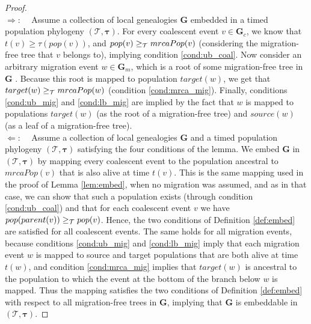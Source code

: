 \documentclass[11pt]{article}
\newcommand{\vect}[1]{\boldsymbol{\mathbf{#1}}}
\newcommand{\Tr}{\mathcal{T}}
\newcommand{\G}{\vect{G}}
\newcommand{\1}{\mathbbm{1}}
\newcommand{\Gc}{\G_c}
\newcommand{\Gm}{\G_m}
\newcommand{\taus}{\vect\tau}
\begin{document}
\begin{proof}
~\\
 $\Rightarrow$:~~ Assume a collection of local genealogies $\G$ embedded in a timed population phylogeny $(\Tr,\taus)$. For every coalescent event $v\in\Gc$, we know that
 $t(v)\geq \tau(pop(v))$, and $pop(v)\anc mrcaPop(v)$ (considering the migration-free tree that $v$ belongs to), implying condition \ref{cond:ub_coal}.
 Now consider an arbitrary migration event $w\in\Gm$, which is a root of some migration-free tree in $\G$ . Because this root is mapped to population $target(w)$, we get that
 $target(w)\anc  mrcaPop(w)$ (condition \ref{cond:mrca_mig}).
 Finally, conditions \ref{cond:ub_mig} and \ref{cond:lb_mig} are implied by the fact that $w$ is mapped to populations $target(w)$ (as the root of a migration-free tree) and
 $source(w)$ (as a leaf of a migration-free tree).\\
 $\Leftarrow$:~~ Assume a collection of local genealogies $\G$ and a timed population phylogeny $(\Tr,\taus)$ satisfying the four conditions of the lemma.
 We embed $\G$ in $(\Tr,\taus)$ by mapping every coalescent event to the population ancestral to $mrcaPop(v)$ that is also alive at time $t(v)$.
 This is the same mapping used in the proof of Lemma \ref{lem:embed}, when no migration was assumed, and as in that case,
 we can show that such a population exists (through condition \ref{cond:ub_coal}) and that for each coalescent event $v$  we have $pop(parent(v))\anc pop(v)$.
 Hence, the two conditions of Definition \ref{def:embed} are satisfied for all coalescent events.
 The same holds for all migration events, because
 conditions \ref{cond:ub_mig} and \ref{cond:lb_mig} imply that each migration event $w$ is mapped to source and target populations that are both alive at time $t(w)$,
 and condition \ref{cond:mrca_mig} implies that $target(w)$ is ancestral to the population to which the event at the bottom of the branch below $w$ is mapped.
 Thus the mapping satisfies the two conditions of Definition \ref{def:embed} with respect to all migration-free trees in $\G$, implying that $\G$ is embeddable
 in $(\Tr,\taus)$.
\end{proof}
\end{document}
